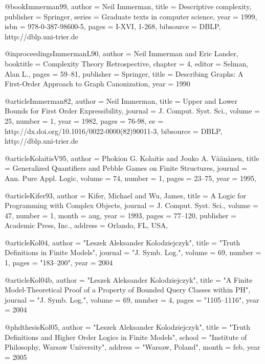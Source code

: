 \documentclass{article}
\begin{document}
@book{Immerman99,
  author    = {Neil Immerman},
  title     = {Descriptive complexity},
  publisher = {Springer},
  series    = {Graduate texts in computer science},
  year      = {1999},
  isbn      = {978-0-387-98600-5},
  pages     = {I-XVI, 1-268},
  bibsource = {DBLP, http://dblp.uni-trier.de}
}

@inproceedings{ImmermanL90,
    author = {Neil Immerman and Eric Lander},
    booktitle = {Complexity Theory Retrospective},
    chapter = {4},
    editor = {Selman, Alan L.},
    pages = {59--81},
    publisher = {Springer},
    title = {Describing Graphs: A First-Order Approach to Graph Canonization},
    year = {1990}
}

@article{Immerman82,
  author    = {Neil Immerman},
  title     = {Upper and Lower Bounds for First Order Expressibility},
  journal   = {J. Comput. Syst. Sci.},
  volume    = {25},
  number    = {1},
  year      = {1982},
  pages     = {76-98},
  ee        = {http://dx.doi.org/10.1016/0022-0000(82)90011-3},
  bibsource = {DBLP, http://dblp.uni-trier.de}
}

@article{KolaitisV95,
  author    = {Phokion G. Kolaitis and
               Jouko A. V{\"{a}}{\"{a}}n{\"{a}}nen},
  title     = {Generalized Quantifiers and Pebble Games on Finite Structures},
  journal   = {Ann. Pure Appl. Logic},
  volume    = {74},
  number    = {1},
  pages     = {23--75},
  year      = {1995},
}

@article{Kifer93,
 author = {Kifer, Michael and Wu, James},
 title = {A Logic for Programming with Complex Objects},
 journal = {J. Comput. Syst. Sci.},
 volume = {47},
 number = {1},
 month = aug,
 year = {1993},
 pages = {77--120},
 publisher = {Academic Press, Inc.},
 address = {Orlando, FL, USA},
} 

@article{Kol04,
  author    = "Leszek Aleksander Kolodziejczyk",
  title     = "Truth Definitions in Finite Models", 
  journal   = "J. Symb. Log.", 
  volume    = 69,
  number    = 1, 
  pages     = "183--200",
  year      = 2004
}

@article{Kol04b,
  author    = "Leszek Aleksander Kolodziejczyk",
  title     = "A Finite Model-Theoretical Proof of a Property of Bounded Query Classes within {PH}", 
  journal   = "J. Symb. Log.", 
  volume    = 69,
  number    = 4, 
  pages     = "1105--1116",
  year      = 2004
}

@phdthesis{Kol05,
  author    = "Leszek Aleksander Kolodziejczyk",
  title     = "Truth Definitions and Higher Order Logics in Finite Models",
  school    = "Institute of Philosophy, Warsaw University",
  address   = "Warsaw, Poland",
  month     = feb,
  year      = 2005
}
\end{document}
